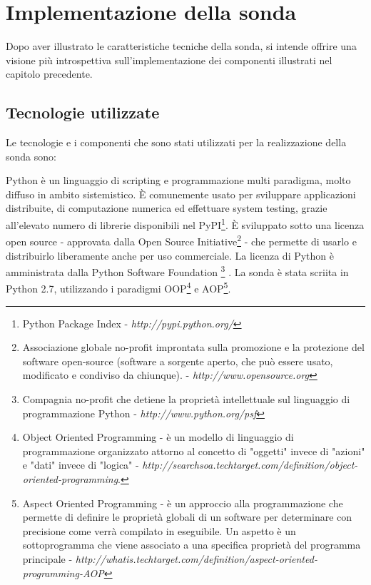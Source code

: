 \documentclass[../main.tex]{subfiles}
\begin{document}
\chapter{Implementazione della sonda}
Dopo aver illustrato le caratteristiche tecniche della sonda, si intende offrire una visione più introspettiva sull'implementazione dei componenti illustrati nel capitolo precedente.

\section{Tecnologie utilizzate}
Le tecnologie e i componenti che sono stati utilizzati per la realizzazione della sonda sono:
\newline
\begin{description}[nolistsep]
\item[Python 2.7]
Python è un linguaggio di scripting e programmazione multi paradigma, molto diffuso in ambito sistemistico.
\`E comunemente usato per sviluppare applicazioni distribuite, di computazione numerica ed effettuare system testing, grazie all'elevato numero di librerie disponibili nel PyPI\footnote{Python Package Index - \textit{http://pypi.python.org/}}.
\`E sviluppato sotto una licenza open source - approvata dalla Open Source Initiative\footnote{Associazione globale no-profit improntata sulla promozione e la protezione del software open-source (software a sorgente aperto, che può essere usato, modificato e condiviso da chiunque). - \textit{http://www.opensource.org}} - che permette di usarlo e distribuirlo liberamente anche per uso commerciale.
\newline La licenza di Python è amministrata dalla Python Software Foundation
\footnote{Compagnia no-profit che detiene la proprietà intellettuale sul linguaggio di programmazione Python - \textit{http://www.python.org/psf}}
\cite{PythonWebsite}.
\newline
La sonda è stata scriita in Python 2.7, utilizzando i paradigmi OOP\footnote{Object Oriented Programming - è un modello di linguaggio di programmazione organizzato attorno al concetto di "oggetti" invece di "azioni" e "dati" invece di "logica" - \textit{http://searchsoa.techtarget.com/definition/object-oriented-programming}.} e AOP\footnote{Aspect Oriented Programming - è un approccio alla programmazione che permette di definire le proprietà globali di un software per determinare con precisione come verrà compilato in eseguibile. Un aspetto è un sottoprogramma che viene associato a una specifica proprietà del programma principale - \textit{http://whatis.techtarget.com/definition/aspect-oriented-programming-AOP} }.
\newline


\end{description}
\end{document}
